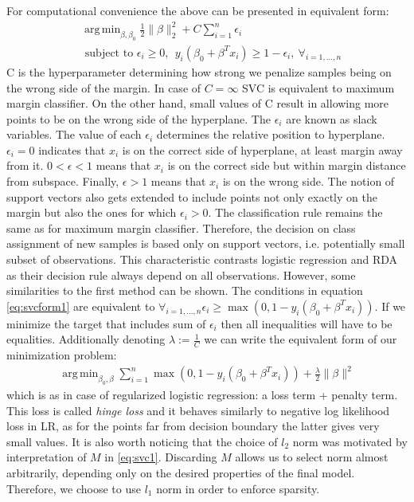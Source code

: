 \documentclass[shortabstract, english, mgr]{iithesis}
\DeclareMathOperator*{\argmin}{arg\,min}
\begin{document}
For computational convenience the above can be presented in equivalent form:
\begin{align}
& \argmin_{\beta, \beta_0} \frac{1}{2}\|\beta\|^2_2 + C \sum_{i=1}^n \epsilon_i \nonumber \\ &{\text { subject to }}\epsilon_i \geq 0, \ \  y_{i}\left(\beta_{0}+\beta^T x_i\right) \geq 1 - \epsilon_i, \ \forall_{i=1, \ldots, n} \label{eq:svcform1}
\end{align}
C is the hyperparameter determining how strong we penalize samples being on the wrong side of the margin. In case of $C = \infty$ SVC is equivalent to maximum margin classifier. On the other hand, small values of C result in allowing more points to be on the wrong side of the hyperplane. The $\epsilon_i$ are known as slack variables. The value of each $\epsilon_i$ determines the relative position to hyperplane. $\epsilon_i=0$ indicates that $x_i$ is on the correct side of hyperplane, at least margin away from it. $0< \epsilon < 1$ means that $x_i$ is on the correct side but within margin distance from subspace. Finally, $\epsilon > 1$ means that $x_i$ is on the wrong side. The notion of support vectors also gets extended to include points not only exactly on the margin but also the ones for which $\epsilon_i > 0$. The classification rule remains the same as for maximum margin classifier. Therefore, the decision on class assignment of new samples is based only on support vectors, i.e. potentially small subset of observations. This characteristic contrasts logistic regression and RDA as their decision rule always depend on all observations. However, some similarities to the first method can be shown. The conditions in equation \ref{eq:svcform1} are equivalent to $\forall_{i=1, \ldots, n} \epsilon_i \geq \max \left(0, 1 - y_i(\beta_0 + \beta^Tx_i) \right)$. If we minimize the target that includes sum of $\epsilon_i$ then all inequalities will have to be equalities. Additionally denoting $\lambda := \frac{1}{C}$ we can write the equivalent form of our minimization problem:
\begin{align*}
    \argmin_{\beta_0, \beta} \sum_{i=1}^n \max \left(0, 1 - y_i(\beta_0 + \beta^Tx_i)\right) + \frac{\lambda}{2} \|\beta\|^2
\end{align*}
which is as in case of regularized logistic regression: a loss term + penalty term. This loss is called \textit{hinge loss} and it behaves similarly to negative log likelihood loss in LR, as for the points far from decision boundary the latter gives very small values. It is also worth noticing that the choice of $l_2$ norm was motivated by interpretation of $M$ in \ref{eq:svc1}. Discarding $M$ allows us to select norm almost arbitrarily, depending only on the desired properties of the final model. Therefore, we choose to use $l_1$ norm in order to enforce sparsity. 
\end{document}
